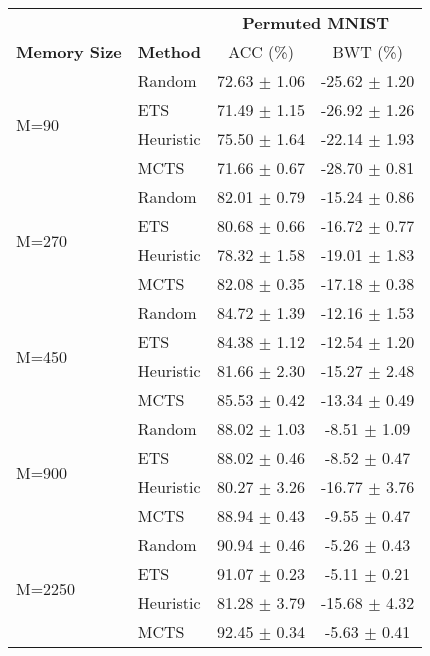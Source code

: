 \begin{tabular}{llcc}
\toprule
                        &                 & \multicolumn{2}{c}{\textbf{Permuted MNIST}} \\
\cmidrule(lr){3-4}
\textbf{Memory Size}    & \textbf{Method} & ACC (\%)             & BWT (\%)             \\
\midrule
\multirow{4}{*}{M=90}   & Random          & 72.63 $\pm$ 1.06       & -25.62 $\pm$ 1.20      \\
                        & ETS             & 71.49 $\pm$ 1.15       & -26.92 $\pm$ 1.26      \\
                        & Heuristic         & 75.50 $\pm$ 1.64       & -22.14 $\pm$ 1.93      \\
                        & MCTS            & 71.66 $\pm$ 0.67       & -28.70 $\pm$ 0.81      \\
\midrule
\multirow{4}{*}{M=270}  & Random          & 82.01 $\pm$ 0.79       & -15.24 $\pm$ 0.86      \\
                        & ETS             & 80.68 $\pm$ 0.66       & -16.72 $\pm$ 0.77      \\
                        & Heuristic         & 78.32 $\pm$ 1.58       & -19.01 $\pm$ 1.83      \\
                        & MCTS            & 82.08 $\pm$ 0.35       & -17.18 $\pm$ 0.38      \\
\midrule
\multirow{4}{*}{M=450}  & Random          & 84.72 $\pm$ 1.39       & -12.16 $\pm$ 1.53      \\
                        & ETS             & 84.38 $\pm$ 1.12       & -12.54 $\pm$ 1.20      \\
                        & Heuristic         & 81.66 $\pm$ 2.30       & -15.27 $\pm$ 2.48      \\
                        & MCTS            & 85.53 $\pm$ 0.42       & -13.34 $\pm$ 0.49      \\
\midrule
\multirow{4}{*}{M=900}  & Random          & 88.02 $\pm$ 1.03       & -8.51 $\pm$ 1.09       \\
                        & ETS             & 88.02 $\pm$ 0.46       & -8.52 $\pm$ 0.47       \\
                        & Heuristic         & 80.27 $\pm$ 3.26       & -16.77 $\pm$ 3.76      \\
                        & MCTS            & 88.94 $\pm$ 0.43       & -9.55 $\pm$ 0.47       \\
\midrule
\multirow{4}{*}{M=2250} & Random          & 90.94 $\pm$ 0.46       & -5.26 $\pm$ 0.43       \\
                        & ETS             & 91.07 $\pm$ 0.23       & -5.11 $\pm$ 0.21       \\
                        & Heuristic         & 81.28 $\pm$ 3.79       & -15.68 $\pm$ 4.32      \\
                        & MCTS            & 92.45 $\pm$ 0.34       & -5.63 $\pm$ 0.41 \\
\bottomrule
\end{tabular}